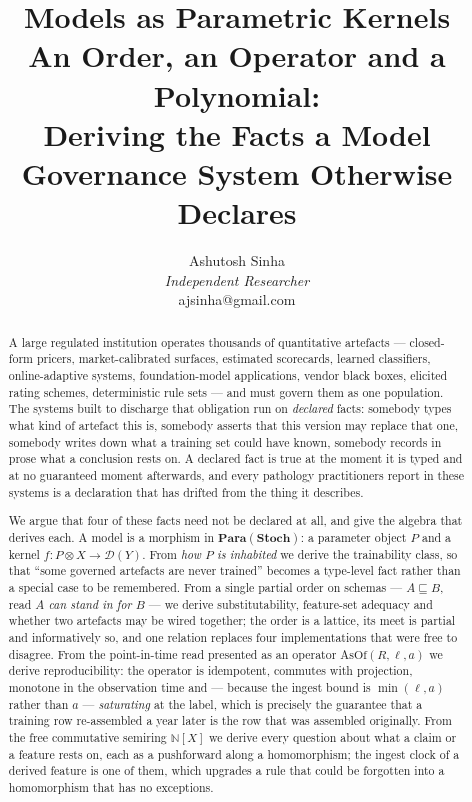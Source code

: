\documentclass[11pt,a4paper]{article}
\title{\bfseries Models as Parametric Kernels\\[6pt]
{\large An Order, an Operator and a Polynomial:\\
Deriving the Facts a Model Governance System Otherwise Declares}}
\author{Ashutosh Sinha\\[2pt]
{\normalsize\itshape Independent Researcher}\\[2pt]
{\normalsize\ttfamily ajsinha@gmail.com}}
\date{}
\renewcommand{\_}{\oldunderscore\allowbreak}
\theoremstyle{plain}
\theoremstyle{definition}
\theoremstyle{definition}
\theoremstyle{remark}
\newcommand{\Cat}[1]{\mathbf{#1}}
\newcommand{\Stoch}{\Cat{Stoch}}
\newcommand{\Para}{\mathbf{Para}}
\newcommand{\Nat}{\mathbb{N}}
\newcommand{\AsOf}{\mathrm{AsOf}}
\begin{document}

\maketitle

\begin{abstract}
\noindent
A large regulated institution operates thousands of quantitative artefacts --- closed-form pricers,
market-calibrated surfaces, estimated scorecards, learned classifiers, online-adaptive systems,
foundation-model applications, vendor black boxes, elicited rating schemes, deterministic rule sets ---
and must govern them as one population. The systems built to discharge that obligation run on
\emph{declared} facts: somebody types what kind of artefact this is, somebody asserts that this version
may replace that one, somebody writes down what a training set could have known, somebody records in
prose what a conclusion rests on. A declared fact is true at the moment it is typed and at no guaranteed
moment afterwards, and every pathology practitioners report in these systems is a declaration that has
drifted from the thing it describes.

We argue that four of these facts need not be declared at all, and give the algebra that derives each.
A model is a morphism in $\Para(\Stoch)$: a parameter object $P$ and a kernel
$f \colon P \otimes X \to \mathcal{D}(Y)$. From \emph{how $P$ is inhabited} we derive the trainability
class, so that ``some governed artefacts are never trained'' becomes a type-level fact rather than a
special case to be remembered. From a single partial order on schemas --- $A \sqsubseteq B$, read
\emph{$A$ can stand in for $B$} --- we derive substitutability, feature-set adequacy and whether two
artefacts may be wired together; the order is a lattice, its meet is partial and informatively so, and
one relation replaces four implementations that were free to disagree. From the point-in-time read
presented as an operator $\AsOf(R,\ell,a)$ we derive reproducibility: the operator is idempotent,
commutes with projection, monotone in the observation time and --- because the ingest bound is
$\min(\ell,a)$ rather than $a$ --- \emph{saturating} at the label, which is precisely the guarantee that
a training row re-assembled a year later is the row that was assembled originally. From the free
commutative semiring $\Nat[X]$ we derive every question about what a claim or a feature rests on, each as
a pushforward along a homomorphism; the ingest clock of a derived feature is one of them, which upgrades
a rule that could be forgotten into a homomorphism that has no exceptions.


\end{abstract}
\end{document}
